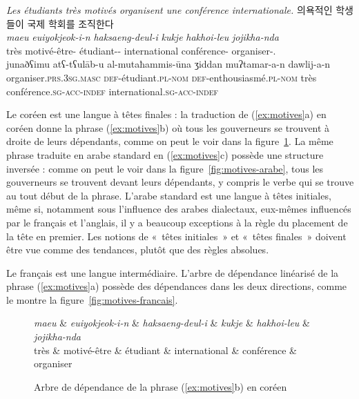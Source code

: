 {\ea \label{ex:motives}
    \ea \textit{{Les étudiants très motivés organisent une conférence internationale.}} 
    \ex {}  {\cjkfont 의욕적인}  {\cjkfont 학생들이}  {\cjkfont 국제}  {\cjkfont 학회를}   {\cjkfont 조직한다}\\
         \textit{maeu}  \textit{euiyokjeok-i-n}  \textit{haksaeng-deul-i}  \textit{kukje}  \textit{hakhoi-leu}   \textit{jojikha-nda}\\
         très   {motivé-être-\Q}   {étudiant-\PL-\NOM}  international  {conférence-\ACC}  organiser-\IND.\PRS\\
    \ex \gll junaðʕimu  atʕ-tʕul\=ab-u al-mutaħammis-\=una ʒiddan muʔtamar-a-n  dawlij-a-n\\
    organiser.\textsc{prs.3sg.masc} \textsc{def}-étudiant.\textsc{pl-nom} \textsc{def}-enthousiasmé.\textsc{pl-nom}  très conférence.\textsc{sg-acc-indef}  international.\textsc{sg-acc-indef}\\
  \z
\z\tcbbreak
    
    Le coréen est une langue à têtes finales : la traduction de (\ref{ex:motives}a) en coréen donne la phrase (\ref{ex:motives}b) où tous les gouverneurs se trouvent à droite de leurs dépendants, comme on peut le voir dans la figure~\ref{fig:motives-coreen}. La même phrase traduite en arabe standard en (\ref{ex:motives}c) possède une structure inversée : comme on peut le voir dans la figure~\ref{fig:motives-arabe}, tous les gouverneurs se trouvent devant leurs dépendants, y compris le verbe qui se trouve au tout début de la phrase. L’arabe standard est une langue à têtes initiales, même si, notamment sous l'influence des arabes dialectaux, eux-mêmes influencés par le français et l'anglais, il y a beaucoup exceptions à la règle du placement de la tête en premier. Les notions de «~têtes initiales~» et «~têtes finales~» doivent être vue comme des tendances, plutôt que des règles absolues.
    
    Le français est une langue intermédiaire. L’arbre de dépendance linéarisé de la phrase (\ref{ex:motives}a) possède des dépendances dans les deux directions, comme le montre la  figure~\ref{fig:motives-francais}.

   
\begin{figure}[H]
    \caption{Arbre de dépendance de la phrase (\ref{ex:motives}b) en coréen\label{fig:motives-coreen}}
    \begin{dependency}[font=\footnotesize,arc edge, arc angle=80, text only label, label style={above}]
    \begin{deptext}
    \textit{maeu}  \& \textit{euiyokjeok-i-n} \& \textit{haksaeng-deul-i} \& \textit{kukje} \& \textit{hakhoi-leu} \& \textit{jojikha-nda}\\
    très  \& {motivé-être}  \& étudiant   \& international \& conférence \& organiser\\
    \end{deptext}
    \end{dependency}
\end{figure}

}
